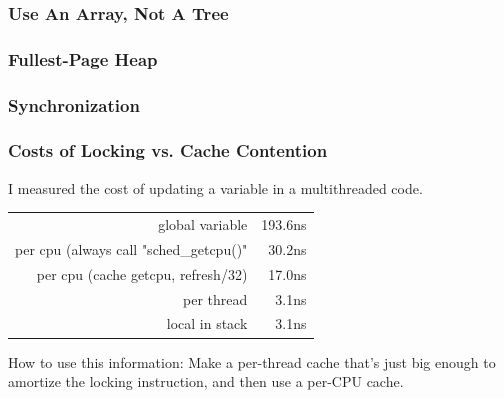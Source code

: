 \documentclass[xcolor=dvipsnames,14pt]{beamer}
\newcommand{\punt}[1]{}
\newcommand{\smmpunt}[1]{#1}
\begin{document}
\punt{
\begin{frame}[fragile]
\frametitle{Use An Array, Not A Tree}

SuperMalloc employs an array.
\begin{itemize}
\item There are only $2^{27}$ possible chunks.  Need 32 bits to code the size, a total of
$2^{29}$ bytes.

\item "mmap()" mostly returns adjacent blocks.

\item E.g., a program that uses $128$ GiB of allocated data needs only
  $65,536$ chunks.  The table consumes 512MiB of address space, but
  only a 256KiB of RSS.

\item Determining an object's size requires $O(1)$ instructions, cache misses, and TLB misses.
\end{itemize}
\end{frame}
}

\begin{frame}[fragile]
\frametitle{Use An Array, Not A Tree}
\hspace*{-0.5cm}
\end{frame}

\smmpunt{
\begin{frame}
\frametitle{Fullest-Page Heap}

\end{frame}

\begin{frame}
\frametitle{Synchronization}
\end{frame}
}

\begin{frame}[fragile]
\frametitle{Costs of Locking vs. Cache Contention}

I measured the cost of updating a variable in a multithreaded code.

\begin{tabular}{rr}
                                                  global variable &    193.6ns \\
            per cpu (always call "sched_getcpu()"  &     30.2ns \\
per cpu (cache getcpu, refresh/32) &     17.0ns \\
                                                      per thread &      3.1ns \\
                                                  local in stack &      3.1ns \\
\end{tabular}

How to use this information:  Make a per-thread cache that's just big enough to amortize the locking instruction, and then use a per-CPU cache.
\end{frame}
\end{document}
